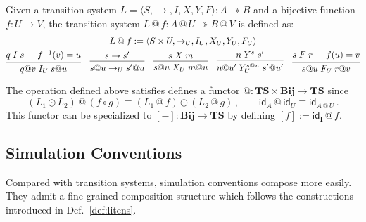\documentclass[acmsmall,screen,review,anonymous]{acmart}
\newcommand{\kw}[1]{\ensuremath{ \mathsf{#1} }}
\begin{document}
\begin{definition}[Lifting] \label{def:lift} %
Given a transition system
$L = \langle S, {\rightarrow}, I, X, Y, F \rangle : A \twoheadrightarrow B$
and a bijective function $f : U \rightarrow V$,
the transition system
$L \mathbin@ f : A \mathbin@ U \twoheadrightarrow B \mathbin@ V$
is defined as:
\begin{gather*}
  L \mathbin@ f := \langle S \times U, {\rightarrow_U}, I_U, X_U, Y_U, F_U \rangle \\
 {\begin{prooftree}
    \hypo{q \mathrel{I} s}
    \hypo{f^{-1}(v) = u}
    \infer2{q@v \mathrel{I_U} s@ u}
  \end{prooftree}}
  \quad
 {\begin{prooftree}
    \hypo{s \rightarrow s'}
    \infer1{s@u \rightarrow_U s'@u}
  \end{prooftree}}
  \quad
 {\begin{prooftree}
    \hypo{s \mathrel{X} m}
    \infer1{s@u \mathrel{X_U} m@u}
  \end{prooftree}}
  \quad
 {\begin{prooftree}
    \hypo{n \mathrel{Y}^s s'}
    \infer1{n@u' \mathrel{Y^{s@u}_U} s'@u'}
  \end{prooftree}}
  \quad
 {\begin{prooftree}
    \hypo{s \mathrel{F} r}
    \hypo{f(u) = v}
    \infer2{s@u \mathrel{F_U} r@v}
  \end{prooftree}}
\end{gather*}
\end{definition}

\begin{theorem} %
The operation defined above satisfies
defines a functor
${@} : \mathbf{TS} \times \mathbf{Bij} \rightarrow \mathbf{TS}$
since
\[
  (L_1 \odot L_2) \mathbin@ (f \circ g) \equiv
    (L_1 \mathbin@ f) \odot (L_2 \mathbin@ g)
  \,,
  \qquad
  \kw{id}_A \mathbin@ \kw{id}_U \equiv \kw{id}_{A \mathbin@ U}
  \,.
\]
This functor can be specialized to
$[-] : \mathbf{Bij} \rightarrow \mathbf{TS}$
by defining
$[f] := \kw{id}_\mathbf{I} \mathbin@ f$.
\end{theorem}


\subsection{Simulation Conventions} \label{sec:scomp:sc} %

Compared with transition systems,
simulation conventions compose more easily.
They admit a fine-grained
composition structure
which follows the constructions introduced in Def.~\ref{def:litens}.
\end{document}
